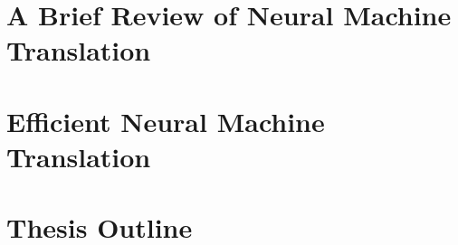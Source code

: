 \section{A Brief Review of Neural Machine Translation}

\section{Efficient Neural Machine Translation}


\section{Thesis Outline}